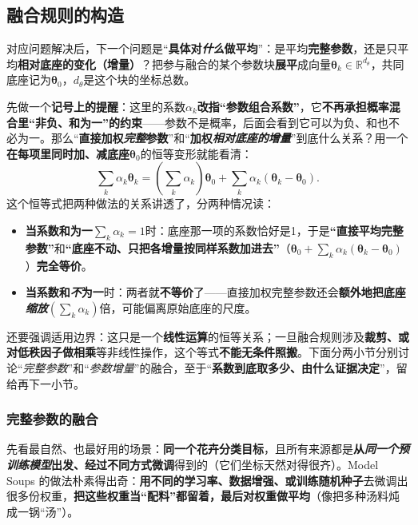 \subsection{融合规则的构造}
\label{sec:ket-integration-merging-rule}

对应问题解决后，下一个问题是“\textbf{具体对\emph{什么}做平均}”：是平均\textbf{完整参数}，还是只平均\textbf{相对底座的变化（增量）}？把参与融合的某个参数块\textbf{展平}成向量$\bm{\theta}_k\in\mathbb{R}^{d_\theta}$，共同底座记为$\bm{\theta}_0$，$d_\theta$是这个块的坐标总数。

先做一个\textbf{记号上的提醒}：这里的系数$\alpha_k$\textbf{改指“参数组合系数”}，它\textbf{不再承担概率混合里“非负、和为一”的约束}——参数不是概率，后面会看到它可以为负、和也不必为一。那么“\textbf{直接加权\emph{完整}参数}”和“\textbf{加权\emph{相对底座的增量}}”到底什么关系？用一个\textbf{在每项里同时加、减底座}$\bm{\theta}_0$的恒等变形就能看清：
\begin{equation}
  \sum_k\alpha_k\bm{\theta}_k
  =\left(\sum_k\alpha_k\right)\bm{\theta}_0+
    \sum_k\alpha_k(\bm{\theta}_k-\bm{\theta}_0).
  \label{eq:ket-integration-rule-equivalence}
\end{equation}
这个恒等式把两种做法的关系讲透了，分两种情况读：
\begin{itemize}\item \textbf{当系数和为一}$\sum_k\alpha_k=1$时：底座那一项的系数恰好是1，于是\textbf{“直接平均完整参数”}和\textbf{“底座不动、只把各增量按同样系数加进去”}（$\bm{\theta}_0+\sum_k\alpha_k(\bm{\theta}_k-\bm{\theta}_0)$）\textbf{完全等价}。\item \textbf{当系数和\emph{不}为一}时：两者就\textbf{不等价}了——直接加权完整参数还会\textbf{额外地把底座\emph{缩放}}$(\sum_k\alpha_k)$倍，可能偏离原始底座的尺度。\end{itemize}
还要强调适用边界：这只是一个\textbf{线性运算}的恒等关系；一旦融合规则涉及\textbf{裁剪、或对低秩因子做相乘}等非线性操作，这个等式\textbf{不能无条件照搬}。下面分两小节分别讨论“\emph{完整参数}”和“\emph{参数增量}”的融合，至于“\textbf{系数到底取多少、由什么证据决定}”，留给再下一小节。

\subsubsection{完整参数的融合}
\label{sec:ket-integration-full-weights}

先看最自然、也最好用的场景：\textbf{同一个花卉分类目标}，且所有来源都是\textbf{从\emph{同一个预训练模型}出发、经过不同方式微调}得到的（它们坐标天然对得很齐）。Model Soups 的做法朴素得出奇：\textbf{用不同的学习率、数据增强、或训练随机种子}去微调出很多份权重，\textbf{把这些权重当“配料”都留着，最后对权重做平均}（像把多种汤料炖成一锅“汤”）。

